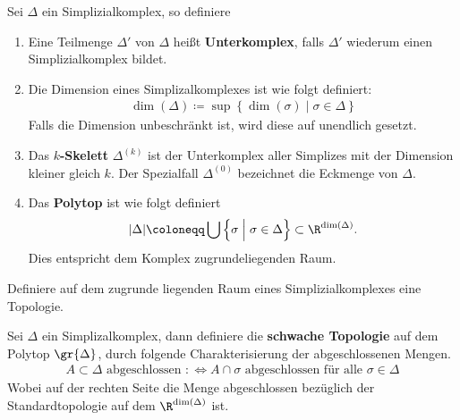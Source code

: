 \begin{Def}
  Sei $\Delta$ ein Simplizialkomplex, so definiere
  \begin{enumerate}[1)]
  \item Eine Teilmenge $\Delta'$ von $\Delta$ heißt
    \textbf{Unterkomplex}, falls $\Delta'$ wiederum einen
    Simplizialkomplex bildet.
  \item Die Dimension eines Simplizalkomplexes ist wie folgt
    definiert:
    \begin{gather*}
      \dim(\Delta) \coloneqq \sup \left\{ \dim(\sigma) \; \Big| \;
        \sigma \in \Delta \right\}
    \end{gather*}
    Falls die Dimension unbeschränkt ist, wird diese auf unendlich
    gesetzt.
  \item Das \textbf{$k$-Skelett} $\Delta^{(k)}$ ist der Unterkomplex
    aller Simplizes mit der Dimension kleiner gleich $k$. Der
    Spezialfall $\Delta^{(0)}$ bezeichnet die Eckmenge von $\Delta$.
  \item Das \textbf{Polytop} ist wie folgt definiert
    \begin{gather*}
      |\Delta| \coloneqq \bigcup \left\{ \sigma \; \Big| \; \sigma \in
        \Delta \right\} \subset \R^{\dim(\Delta)}.
    \end{gather*}
    Dies entspricht dem Komplex zugrundeliegenden Raum.
	\end{enumerate}
\end{Def}



Definiere auf dem zugrunde liegenden Raum eines Simplizialkomplexes eine 
Topologie.

\begin{Def}
	Sei $\Delta$ ein Simplizalkomplex, dann definiere die
	\textbf{schwache Topologie} auf dem Polytop $\gr{\Delta}$,
	durch folgende Charakterisierung der abgeschlossenen Mengen.
	\begin{gather*}
		A \subset \Delta \text{ abgeschlossen } :\Leftrightarrow A \cap
		\sigma \text{ abgeschlossen für alle } \sigma \in \Delta
	\end{gather*}
	Wobei auf der rechten Seite die Menge abgeschlossen bezüglich der
	Standardtopologie auf dem $\R^{\dim(\Delta)}$ ist.
\end{Def}

